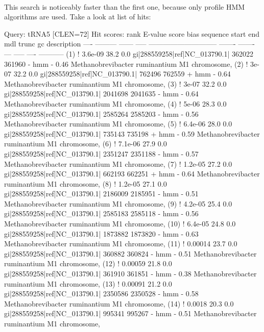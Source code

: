 \\

This search is noticeably faster than the first one, because only
profile HMM algorithms are used. Take a look at list of hits:

\begin{sreoutput}
Query:       tRNA5  [CLEN=72]
Hit scores:
 rank     E-value  score  bias  sequence                        start     end   mdl trunc   gc  description
 ----   --------- ------ -----  ----------------------------- ------- -------   --- ----- ----  -----------
  (1) !   3.6e-09   38.2   0.0  gi|288559258|ref|NC_013790.1|  362022  361960 - hmm     - 0.46  Methanobrevibacter ruminantium M1 chromosome, 
  (2) !     3e-07   32.2   0.0  gi|288559258|ref|NC_013790.1|  762496  762559 + hmm     - 0.64  Methanobrevibacter ruminantium M1 chromosome, 
  (3) !     3e-07   32.2   0.0  gi|288559258|ref|NC_013790.1| 2041698 2041635 - hmm     - 0.64  Methanobrevibacter ruminantium M1 chromosome, 
  (4) !     5e-06   28.3   0.0  gi|288559258|ref|NC_013790.1| 2585264 2585203 - hmm     - 0.56  Methanobrevibacter ruminantium M1 chromosome, 
  (5) !   6.4e-06   28.0   0.0  gi|288559258|ref|NC_013790.1|  735143  735198 + hmm     - 0.59  Methanobrevibacter ruminantium M1 chromosome, 
  (6) !   7.1e-06   27.9   0.0  gi|288559258|ref|NC_013790.1| 2351247 2351188 - hmm     - 0.57  Methanobrevibacter ruminantium M1 chromosome, 
  (7) !   1.2e-05   27.2   0.0  gi|288559258|ref|NC_013790.1|  662193  662251 + hmm     - 0.64  Methanobrevibacter ruminantium M1 chromosome, 
  (8) !   1.2e-05   27.1   0.0  gi|288559258|ref|NC_013790.1| 2186009 2185951 - hmm     - 0.51  Methanobrevibacter ruminantium M1 chromosome, 
  (9) !   4.2e-05   25.4   0.0  gi|288559258|ref|NC_013790.1| 2585183 2585118 - hmm     - 0.56  Methanobrevibacter ruminantium M1 chromosome, 
 (10) !   6.4e-05   24.8   0.0  gi|288559258|ref|NC_013790.1| 1873882 1873820 - hmm     - 0.63  Methanobrevibacter ruminantium M1 chromosome, 
 (11) !   0.00014   23.7   0.0  gi|288559258|ref|NC_013790.1|  360882  360824 - hmm     - 0.51  Methanobrevibacter ruminantium M1 chromosome, 
 (12) !   0.00059   21.8   0.0  gi|288559258|ref|NC_013790.1|  361910  361851 - hmm     - 0.38  Methanobrevibacter ruminantium M1 chromosome, 
 (13) !   0.00091   21.2   0.0  gi|288559258|ref|NC_013790.1| 2350586 2350528 - hmm     - 0.58  Methanobrevibacter ruminantium M1 chromosome, 
 (14) !    0.0018   20.3   0.0  gi|288559258|ref|NC_013790.1|  995341  995267 - hmm     - 0.51  Methanobrevibacter ruminantium M1 chromosome, 

\end{sreoutput}
